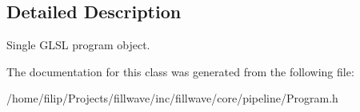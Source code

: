 \subsection{Detailed Description}
Single G\+L\+S\+L program object. 

The documentation for this class was generated from the following file\+:\begin{DoxyCompactItemize}
\item 
/home/filip/\+Projects/fillwave/inc/fillwave/core/pipeline/Program.\+h\end{DoxyCompactItemize}

